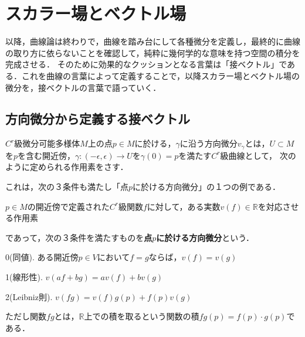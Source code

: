 \documentclass[uplatex, dvipdfmx]{jsreport}
\begin{document}
\chapter{スカラー場とベクトル場}
以降，曲線論は終わりで，曲線を踏み台にして各種微分を定義し，最終的に曲線の取り方に依らないことを確認して，純粋に幾何学的な意味を持つ空間の積分を完成させる．
そのために効果的なクッションとなる言葉は「接ベクトル」である．これを曲線の言葉によって定義することで，以降スカラー場とベクトル場の微分を，接ベクトルの言葉で語っていく．

\section{方向微分から定義する接ベクトル}
\begin{definition}
    $C^r$級微分可能多様体$M$上の点$p\in M$に於ける，$\gamma$に沿う方向微分$v_\gamma$とは，$U\subset M$を$p$を含む開近傍，$\gamma:(-\epsilon,\epsilon)\to U$を$\gamma(0)=p$を満たす$C^r$級曲線として，
    次のように定められる作用素をさす．
    \begin{center}
    \end{center}
\end{definition}
これは，次の３条件も満たし「点$p$に於ける方向微分」の１つの例である．

\begin{definition}[点$p$に於ける方向微分]\label{def-directional-differentiation}
    $p\in M$の開近傍で定義された$C^r$級関数$f$に対して，ある実数$v(f)\in\mathbb{R}$を対応させる作用素
    \begin{center}
    \end{center}
    であって，次の３条件を満たすものを\textbf{点$p$に於ける方向微分}という．

    0(同値). ある開近傍$p\in V$において$f=g$ならば，$v(f)=v(g)$

    1(線形性). $v(af+bg)=av(f)+bv(g)$

    2(Leibniz則). $v(fg)=v(f)g(p)+f(p)v(g)$

    ただし関数$fg$とは，$\mathbb{R}$上での積を取るという関数の積$fg(p)=f(p)\cdot g(p)$である．
\end{definition}
\end{document}
